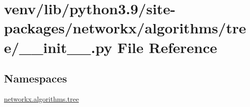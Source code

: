 \hypertarget{venv_2lib_2python3_89_2site-packages_2networkx_2algorithms_2tree_2____init_____8py}{}\section{venv/lib/python3.9/site-\/packages/networkx/algorithms/tree/\+\_\+\+\_\+init\+\_\+\+\_\+.py File Reference}
\label{venv_2lib_2python3_89_2site-packages_2networkx_2algorithms_2tree_2____init_____8py}
\subsection*{Namespaces}
\begin{DoxyCompactItemize}
\item 
 \hyperlink{namespacenetworkx_1_1algorithms_1_1tree}{networkx.\+algorithms.\+tree}
\end{DoxyCompactItemize}
